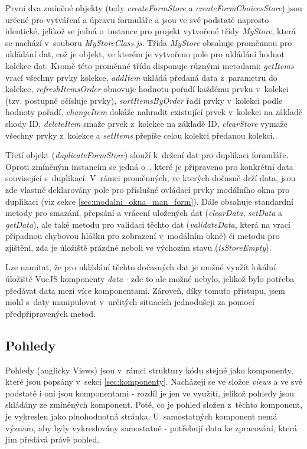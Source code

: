 		První dva zmíněné objekty (tedy \textit{createFormStore} a \textit{createFormChoicesStore}) jsou určené pro vytváření a úpravu formuláře a jsou ve své podstatě naprosto identické, jelikož se jedná o~instance pro projekt vytvořené třídy \textit{MyStore}, která se nachází v~souboru \textit{MyStoreClass.js}. Třída \textit{MyStore} obsahuje proměnnou pro ukládání dat, což je objekt, ve kterém je vytvořeno pole pro ukládání hodnot kolekce dat. Kromě této proměnné třída disponuje různými metodami: \textit{getItems} vrací všechny prvky kolekce, \textit{addItem} ukládá předaná data z~parametru do kolekce, \textit{refreshItemsOrder} obnovuje hodnotu pořadí každému prvku v~kolekci (tzv. postupně očísluje prvky), \textit{sortItemsByOrder} řadí prvky v~kolekci podle hodnoty pořadí, \textit{changeItem} dokáže nahradit existující prvek v~kolekci na základě shody ID, \textit{deleteItem} smaže prvek z~kolekce na základě ID, \textit{clearStore} vymaže všechny prvky z~kolekce a \textit{setItems} přepíše celou kolekci předanou kolekcí.
		
		Třetí objekt (\textit{duplicateFormStore}) slouží k~držení dat pro duplikaci formuláře. Oproti zmíněným instancím se jedná o~, které je připraveno pro konkrétní data související s~duplikací. V~rámci proměnných, ve kterých dočasně drží data, jsou zde vlastně deklarovány pole pro příslušné ovládací prvky modálního okna pro duplikaci (viz sekce \ref{sec:modalni_okna_man_form}). Dále obsahuje standardní metody pro smazání, přepsání a vrácení uložených dat (\textit{clearData}, \textit{setData} a \textit{getData}), ale také metodu pro validaci těchto dat (\textit{validateData}, která na vrací případnou chybovou hlášku pro zobrazení v~modálním okně) či metodu pro zjištění, zda je úložiště prázdné neboli ve výchozím stavu (\textit{isStoreEmpty}).
		
		Lze namítat, že pro ukládání těchto dočasných dat je možné využít lokální úložiště VueJS komponenty \textit{data} - zde to ale možné nebylo, jelikož bylo potřeba předávat data mezi více komponentami. Zároveň, díky tomuto přístupu, jsem mohl s~daty manipulovat v~určitých situacích jednodušeji za pomocí předpřipravených metod.
	
	\subsection{Pohledy}
	Pohledy (anglicky Views) jsou v~rámci struktury kódu stejné jako komponenty, které jsou popsány v~sekci \ref{sec:komponenty}. Nacházejí se ve složce \textit{views} a ve své podstatě i oni jsou komponentami - rozdíl je jen ve využití, jelikož pohledy jsou skládány ze zmíněných komponent. Poté, co je pohled složen z~těchto komponent, je vykreslen jako plnohodnotná stránka. U~samostatných komponent nemá význam, aby byly vykreslovány samostatně - potřebují data ke zpracování, která jim předává právě pohled. 
	

